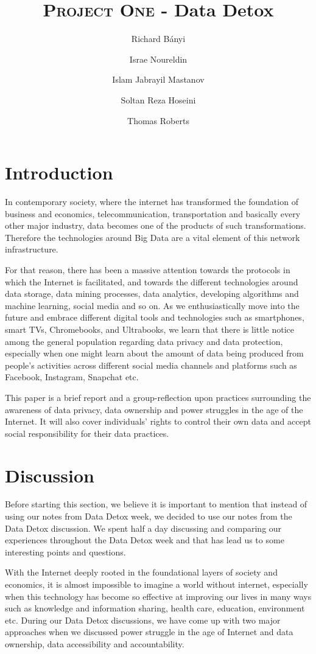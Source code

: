 \documentclass[format=acmsmall, review=false, screen=true]{acmart}
\author{Richard Bányi}
\author{Israe Noureldin}
\author{Islam Jabrayil Mastanov}
\author{Soltan Reza Hoseini}
\author{Thomas Roberts}
\title{\textsc{Project One} - Data Detox}
\begin{document}
\maketitle 

\section{Introduction}
In contemporary society, where the internet has transformed the foundation of business and economics, telecommunication, transportation and basically every other major industry, data becomes one of the products of such transformations. Therefore the technologies around Big Data are a vital element of this network infrastructure.

For that reason, there has been a massive attention towards the protocols in which the Internet is facilitated, and towards the different technologies around data storage, data mining processes, data analytics, developing algorithms and machine learning, social media and so on. As we enthusiastically move into the future and embrace different digital tools and technologies such as smartphones, smart TVs, Chromebooks, and Ultrabooks, we learn that there is little notice among the general population regarding data privacy and data protection, especially when one might learn about the amount of data being produced from people’s activities across different social media channels and platforms such as Facebook, Instagram, Snapchat etc.

This paper is a brief report and a group-reflection upon practices surrounding the awareness of data privacy, data ownership and power struggles in the age of the Internet. It will also cover individuals’ rights to control their own data and accept social responsibility for their data practices.


\section{Discussion}
Before starting this section, we believe it is important to mention that instead of using our notes from Data Detox week, we decided to use our notes from the Data Detox discussion. We spent half a day discussing and comparing our experiences throughout the Data Detox week and that has lead us to some interesting points and questions.
 
With the Internet deeply rooted in the foundational layers of society and economics, it is almost impossible to imagine a world without internet, especially when this technology has become so effective at improving our lives in many ways such as knowledge and information sharing, health care, education, environment etc.
During our Data Detox discussions, we have come up with two major approaches when we discussed power struggle in the age of Internet and data ownership, data accessibility and accountability.
 
\end{document}
